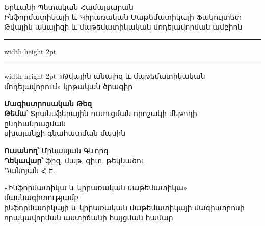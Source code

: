\documentclass[12pt]{article}
\begin{document}
\newtheorem{theorem}{Թեորեմ}
\newtheorem{lemma}{Լեմմա}
\newtheorem{corollary}{Հետևանք}
\newtheorem{preposition}{Պնդում}
\newtheorem{defination}{Սահմանում}


\theoremstyle{definition} %
\newtheorem{innercustomcase}{Դեպք}
\newenvironment{customcase}[1]
  {\renewcommand\theinnercustomcase{#1}\innercustomcase}
  {\endinnercustomcase}
\newtheorem{case}{Դեպք}

\raggedbottom


\begin{titlepage}

\begin{center}
\large  Երևանի Պետական Համալսարան\\
\large Ինֆորմատիկայի և Կիրառական Մաթեմատիկայի Ֆակուլտետ\\
 Թվային անալիզի և մաթեմատիկական մոդելավորման ամբիոն\\
 \vspace{2mm}
\hrule width \hsize height 2pt  \kern 1mm \hrule width \hsize height 2pt 
\vspace{12mm}
«Թվային անալիզ և մաթեմատիկական մոդելավորում»
կրթական ծրագիր


\vspace{28mm}
\textbf{\huge Մագիստրոսական Թեզ\\}\noindent \newline \newline
\textbf{\large Թեմա՝}	\hspace{3mm} Տրանսֆերային ուսուցման որոշակի մեթոդի ընդհանրացման \\ սխալանքի գնահատման մասին
\end{center}
\vspace{12mm}
\begin{flushright}
\textbf{\large Ուսանող՝ \hspace{18mm}}			Մինասյան Գևորգ \\
\vspace{4mm}
\textbf{\large Ղեկավար՝ \hspace{2mm}}			ֆիզ. մաթ. գիտ. թեկնածու \\  Դանոյան  Հ.Է.
\end{flushright}
 \vspace{10mm}
\begin{center}
«Ինֆորմատիկա և կիրառական մաթեմատիկա»  մասնագիտությամբ \\
ինֆորմատիկայի և կիրառական մաթեմատիկայի մագիստրոսի \\ որակավորման աստիճանի հայցման համար
\end{center}

\vspace{12mm}
\end{titlepage}
\end{document}
